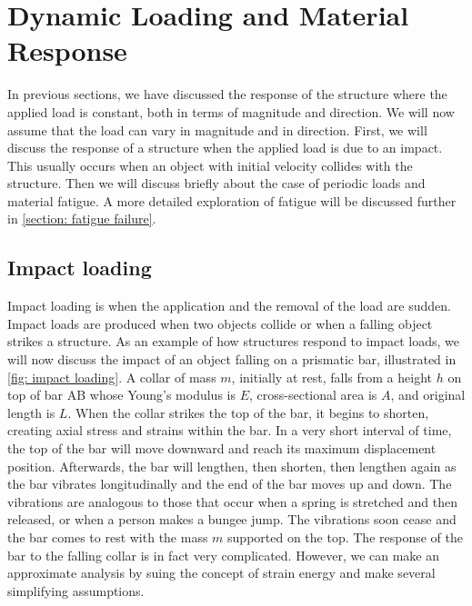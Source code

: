 \documentclass[
fontsize=10pt,
a4paper,
twosides=false,
open=any,
svgnames,
]{kaobook} %
\begin{document}
\section{Dynamic Loading and Material Response}

In previous sections, we have discussed the response of the structure where the applied load is constant, both in terms of magnitude and direction. We will now assume that the load can vary in magnitude and in direction. First, we will discuss the response of a structure when the applied load is due to an impact. This usually occurs when an object with initial velocity collides with the structure. Then we will discuss briefly about the case of periodic loads and material fatigue. A more detailed exploration of fatigue will be discussed further in \cref{section: fatigue failure}.

\subsection{Impact loading}

Impact loading is when the application and the removal of the load are sudden. Impact loads are produced when two objects collide or when a falling object strikes a structure. As an example of how structures respond to impact loads, we will now discuss the impact of an object falling on a prismatic bar, illustrated in \cref{fig: impact loading}. A collar of mass $m$, initially at rest, falls from a height $h$ on top of bar AB whose Young's modulus is $E$, cross-sectional area is $A$, and original length is $L$. When the collar strikes the top of the bar, it begins to shorten, creating axial stress and strains within the bar. In a very short interval of time, the top of the bar will move downward and reach its maximum displacement position. Afterwards, the bar will lengthen, then shorten, then lengthen again as the bar vibrates longitudinally and the end of the bar moves up and down. The vibrations are analogous to those that occur when a spring is stretched and then released, or when a person makes a bungee jump. The vibrations soon cease and the bar comes to rest with the mass $m$ supported on the top. The response of the bar to the falling collar is in fact very complicated. However, we can make an approximate analysis by suing the concept of strain energy and make several simplifying assumptions.
\end{document}

